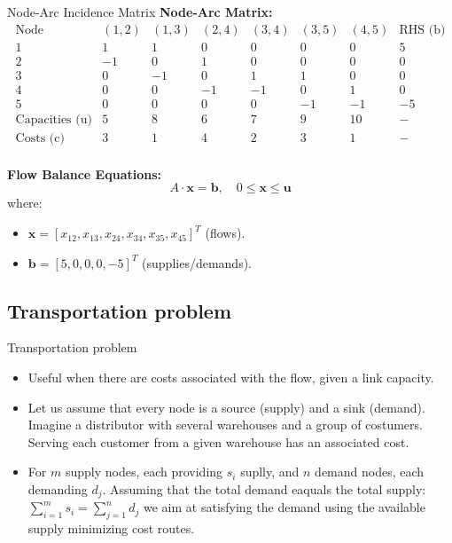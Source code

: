 \documentclass{beamer}
\begin{document}
\begin{frame}[allowframebreaks]{Node-Arc Incidence Matrix}
    \textbf{Node-Arc Matrix:}
    \[
    \begin{array}{c|cccccc|c}
        \text{Node} & (1,2) & (1,3) & (2,4) & (3,4) & (3,5) & (4,5) & \text{RHS (b)} \\ \hline
        1 & 1 & 1 & 0 & 0 & 0 & 0 & 5 \\
        2 & -1 & 0 & 1 & 0 & 0 & 0 & 0 \\
        3 & 0 & -1 & 0 & 1 & 1 & 0 & 0 \\
        4 & 0 & 0 & -1 & -1 & 0 & 1 & 0 \\
        5 & 0 & 0 & 0 & 0 & -1 & -1 & -5 \\ \hline
        \text{Capacities (u)} & 5 & 8 & 6 & 7 & 9 & 10 & - \\
        \text{Costs (c)} & 3 & 1 & 4 & 2 & 3 & 1 & - \\
    \end{array}
    \]

    \framebreak

    \textbf{Flow Balance Equations:}
    \[
    A \cdot \mathbf{x} = \mathbf{b}, \quad 0 \leq \mathbf{x} \leq \mathbf{u}
    \]
    where:
    \begin{itemize}
        \item \( \mathbf{x} = [x_{12}, x_{13}, x_{24}, x_{34}, x_{35}, x_{45}]^T \) (flows).
        \item \( \mathbf{b} = [5, 0, 0, 0, -5]^T \) (supplies/demands).
    \end{itemize}
\end{frame}

\subsection{Transportation problem}

\begin{frame}{Transportation problem}
\begin{itemize}
  \item Useful when there are costs associated with the flow, given a link capacity. 
  \item Let us assume that every node is a source (supply) and a sink (demand). Imagine a distributor with several warehouses and a group of costumers. Serving each customer from a given warehouse has an associated cost.
  \item For $m$ supply nodes, each providing $s_i$ suplly,  and $n$ demand nodes, each demanding $d_j$. Assuming that the total demand eaquals the total supply: $\sum_{i=1}^m s_i = \sum_{j=1}^n d_j$ we aim at satisfying the demand using the available supply minimizing cost routes.
\end{itemize}
\end{frame}
\end{document}
